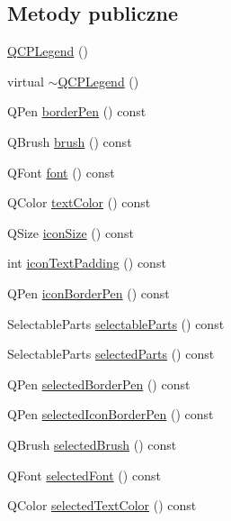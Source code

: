 \subsection*{Metody publiczne}
\begin{DoxyCompactItemize}
\item 
\hyperlink{class_q_c_p_legend_a0001a456989bd07ea378883651fabd72}{Q\+C\+P\+Legend} ()
\item 
virtual \hyperlink{class_q_c_p_legend_a52b305572e20f4e7cb37e945e2b9bec0}{$\sim$\+Q\+C\+P\+Legend} ()
\item 
Q\+Pen \hyperlink{class_q_c_p_legend_a8ffd92df86ddf43696d95f04a20e3226}{border\+Pen} () const 
\item 
Q\+Brush \hyperlink{class_q_c_p_legend_a7e5d2766e7d724f399022be8a4e8a2cb}{brush} () const 
\item 
Q\+Font \hyperlink{class_q_c_p_legend_a5cf8b840bc02f7bf4edb8dde400d0f41}{font} () const 
\item 
Q\+Color \hyperlink{class_q_c_p_legend_ad60a058af7491f6b140c104c6a0f9458}{text\+Color} () const 
\item 
Q\+Size \hyperlink{class_q_c_p_legend_a27dfb770b14adc0e8811bef8129780a5}{icon\+Size} () const 
\item 
int \hyperlink{class_q_c_p_legend_a9d6d07042a284c4ba5f9e3cb5c9281ef}{icon\+Text\+Padding} () const 
\item 
Q\+Pen \hyperlink{class_q_c_p_legend_a2c4719d79630b0d0c75ef2333c59a912}{icon\+Border\+Pen} () const 
\item 
Selectable\+Parts \hyperlink{class_q_c_p_legend_aa90c7fdbad7a0e93527bafb1f1f49a43}{selectable\+Parts} () const 
\item 
Selectable\+Parts \hyperlink{class_q_c_p_legend_abbbf1b2d6a149013527ed87b0780894a}{selected\+Parts} () const 
\item 
Q\+Pen \hyperlink{class_q_c_p_legend_a63156bc4ce64431bada7415cfa2b4dd1}{selected\+Border\+Pen} () const 
\item 
Q\+Pen \hyperlink{class_q_c_p_legend_a165630cad7e41f89b54f65cdef3310e8}{selected\+Icon\+Border\+Pen} () const 
\item 
Q\+Brush \hyperlink{class_q_c_p_legend_a600dde0d207ddc6f5a603767360cceac}{selected\+Brush} () const 
\item 
Q\+Font \hyperlink{class_q_c_p_legend_a4c1b08fc0afacb4ffd54f6a49737fa77}{selected\+Font} () const 
\item 
Q\+Color \hyperlink{class_q_c_p_legend_a08005f3c17728c2c4e23b8ffc0842ffb}{selected\+Text\+Color} () const 

\end{DoxyCompactItemize}
